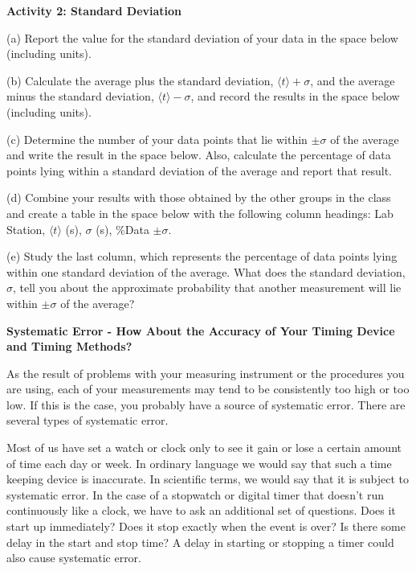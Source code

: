 \textbf{Activity 2: Standard Deviation} 

(a) Report the value for the standard deviation of your data in the space below (including units).
\vspace{10mm}

(b) Calculate the average plus the standard deviation, \(\langle t\rangle 
+ \sigma  \),
and the average minus the standard deviation, \(\langle t\rangle - \sigma  \), 
and record
the results in the space below (including units).
\vspace{10mm}

(c) Determine the number of your data points that lie within \( \pm \sigma  \)
of the average and write the result in the space below. Also, calculate the
percentage of data points lying within a standard deviation of the average and
report that result.
\vspace{10mm}

(d) Combine your results with those obtained by the other groups in the class
and create a table in the space below with the following column headings: Lab
Station, \( \langle t\rangle\) (s), \( \sigma  \) (s), \%Data \( \pm \sigma  \).
\vspace{50mm}

(e) Study the last column, which represents the percentage of data points lying
within one standard deviation of the average. What does the standard deviation,
\( \sigma  \), tell you about the approximate probability that another measurement
will lie within \( \pm \sigma  \) of the average?
\vspace{20mm}

\textbf{Systematic Error - How About the Accuracy of Your Timing Device and
Timing Methods?} 

As the result of problems with your measuring instrument or the procedures you
are using, each of your measurements may tend to be consistently too high or
too low. If this is the case, you probably have a source of systematic error.
There are several types of systematic error.

Most of us have set a watch or clock only to see it gain or lose a certain amount
of time each day or week. In ordinary language we would say that such a time
keeping device is inaccurate. In scientific terms, we would say that it is subject
to systematic error. In the case of a stopwatch or digital timer that doesn't
run continuously like a clock, we have to ask an additional set of questions.
Does it start up immediately? Does it stop exactly when the event is over? Is
there some delay in the start and stop time? A delay in starting or stopping
a timer could also cause systematic error.

